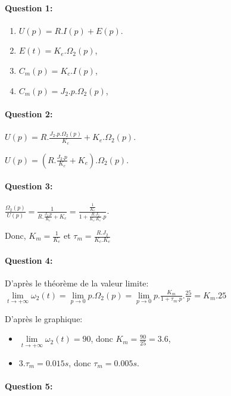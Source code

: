 \paragraph{Question 1:}

\begin{enumerate}
 \item $U(p)=R.I(p)+E(p)$.
 \item $E(t)=K_e.\Omega_2(p)$,
 \item $C_m(p)=K_c.I(p)$,
 \item $C_m(p)=J_2.p.\Omega_2(p)$,
\end{enumerate}

\paragraph{Question 2:}

$U(p)=R.\frac{J_2.p.\Omega_2(p)}{K_c}+K_e.\Omega_2(p)$.

$U(p)=\left(R.\frac{J_2.p}{K_c}+K_e\right).\Omega_2(p)$.

\paragraph{Question 3:}

$\frac{\Omega_2(p)}{U(p)}=\frac{1}{R.\frac{J_2.p}{K_c}+K_e}=\frac{\frac{1}{K_e}}{1+\frac{R.J_2}{K_c.K_e}.p}$.

Donc, $K_m=\frac{1}{K_e}$ et $\tau_m=\frac{R.J_2}{K_c.K_e}$


\paragraph{Question 4:}

D'après le théorème de la valeur limite: \\
$\lim\limits_{t\rightarrow +\infty} \omega_2(t)=\lim\limits_{p\rightarrow 0} p.\Omega_2(p)=\lim\limits _{p\rightarrow 0} p.\frac{K_m}{1+\tau_m.p}.\frac{25}{p}=K_m.25$

D'après le graphique: 
\begin{itemize}
 \item $\lim\limits_{t\rightarrow +\infty} \omega_2(t)=90$, donc $K_m=\frac{90}{25}=3.6$,
 \item $3.\tau_m=0.015s$, donc $\tau_m=0.005s$.
\end{itemize}


\paragraph{Question 5:}

